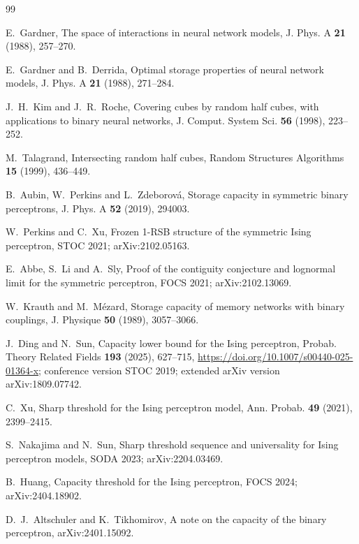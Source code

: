\documentclass[11pt]{article}
\begin{document}
\begin{thebibliography}{99}

E.~Gardner,
The space of interactions in neural network models,
J. Phys. A \textbf{21} (1988), 257--270.

E.~Gardner and B.~Derrida,
Optimal storage properties of neural network models,
J. Phys. A \textbf{21} (1988), 271--284.

J.~H.~Kim and J.~R.~Roche,
Covering cubes by random half cubes, with applications to binary neural
networks,
J. Comput. System Sci. \textbf{56} (1998), 223--252.

M.~Talagrand,
Intersecting random half cubes,
Random Structures Algorithms \textbf{15} (1999), 436--449.

B.~Aubin, W.~Perkins and L.~Zdeborov\'a,
Storage capacity in symmetric binary perceptrons,
J. Phys. A \textbf{52} (2019), 294003.

W.~Perkins and C.~Xu,
Frozen 1-RSB structure of the symmetric Ising perceptron,
STOC 2021; arXiv:2102.05163.

E.~Abbe, S.~Li and A.~Sly,
Proof of the contiguity conjecture and lognormal limit for the symmetric
perceptron,
FOCS 2021; arXiv:2102.13069.

W.~Krauth and M.~M\'ezard,
Storage capacity of memory networks with binary couplings,
J. Physique \textbf{50} (1989), 3057--3066.

J.~Ding and N.~Sun,
Capacity lower bound for the Ising perceptron,
Probab. Theory Related Fields \textbf{193} (2025), 627--715,
\url{https://doi.org/10.1007/s00440-025-01364-x}; conference version STOC
2019; extended arXiv version arXiv:1809.07742.

C.~Xu,
Sharp threshold for the Ising perceptron model,
Ann. Probab. \textbf{49} (2021), 2399--2415.

S.~Nakajima and N.~Sun,
Sharp threshold sequence and universality for Ising perceptron models,
SODA 2023; arXiv:2204.03469.

B.~Huang,
Capacity threshold for the Ising perceptron,
FOCS 2024; arXiv:2404.18902.

D.~J.~Altschuler and K.~Tikhomirov,
A note on the capacity of the binary perceptron,
arXiv:2401.15092.


\end{thebibliography}
\end{document}
